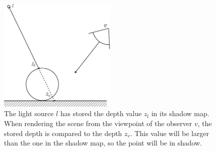 \begin{figure}[hp]
	\centering
	\includegraphics[width=0.5\textwidth]{./graf/shadow_mapping_basic.pdf}
	\caption{The light source \(l\) has stored the depth value \(z_l\) in its shadow map. When rendering the scene from the viewpoint of the observer \(v\), the stored depth is compared to the depth \(z_v\). This value will be larger than the one in the shadow map, so the point will be in shadow.}
	\label{fig:shadow_map_basic}
\end{figure}

